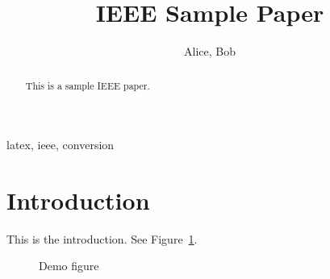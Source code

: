 \documentclass[conference]{IEEEtran}
\title{IEEE Sample Paper}
\author{Alice, Bob}
\begin{document}
\maketitle
\begin{abstract}
This is a sample IEEE paper.
\end{abstract}
\begin{IEEEkeywords}
latex, ieee, conversion
\end{IEEEkeywords}
\section{Introduction}
This is the introduction. See Figure~\ref{fig:demo}. \cite{ref1}
\begin{figure}[tbp]
\caption{Demo figure}
\label{fig:demo}
\end{figure}

\end{document}
